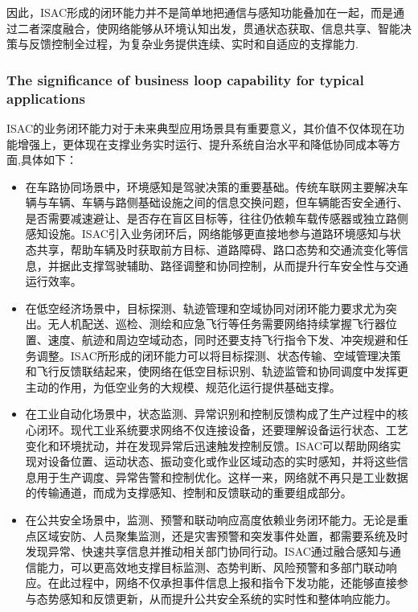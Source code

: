 因此，ISAC形成的闭环能力并不是简单地把通信与感知功能叠加在一起，而是通过二者深度融合，使网络能够从环境认知出发，贯通状态获取、信息共享、智能决策与反馈控制全过程，为复杂业务提供连续、实时和自适应的支撑能力.

\subsubsection{The significance of business loop capability for typical applications}
\label{subsubsec:ch1-isac-core value-closed loop-applications}

ISAC的业务闭环能力对于未来典型应用场景具有重要意义，其价值不仅体现在功能增强上，更体现在支撑业务实时运行、提升系统自治水平和降低协同成本等方面,具体如下：

\begin{itemize}
\item 在车路协同场景中，环境感知是驾驶决策的重要基础。传统车联网主要解决车辆与车辆、车辆与路侧基础设施之间的信息交换问题，但车辆能否安全通行、是否需要减速避让、是否存在盲区目标等，往往仍依赖车载传感器或独立路侧感知设施。ISAC引入业务闭环后，网络能够更直接地参与道路环境感知与状态共享，帮助车辆及时获取前方目标、道路障碍、路口态势和交通流变化等信息，并据此支撑驾驶辅助、路径调整和协同控制，从而提升行车安全性与交通运行效率。

\item 在低空经济场景中，目标探测、轨迹管理和空域协同对闭环能力要求尤为突出。无人机配送、巡检、测绘和应急飞行等任务需要网络持续掌握飞行器位置、速度、航迹和周边空域动态，同时还要支持飞行指令下发、冲突规避和任务调整。ISAC所形成的闭环能力可以将目标探测、状态传输、空域管理决策和飞行反馈联结起来，使网络在低空目标识别、轨迹监管和协同调度中发挥更主动的作用，为低空业务的大规模、规范化运行提供基础支撑。

\item 在工业自动化场景中，状态监测、异常识别和控制反馈构成了生产过程中的核心闭环。现代工业系统要求网络不仅连接设备，还要理解设备运行状态、工艺变化和环境扰动，并在发现异常后迅速触发控制反馈。ISAC可以帮助网络实现对设备位置、运动状态、振动变化或作业区域动态的实时感知，并将这些信息用于生产调度、异常告警和控制优化。这样一来，网络就不再只是工业数据的传输通道，而成为支撑感知、控制和反馈联动的重要组成部分。

\item 在公共安全场景中，监测、预警和联动响应高度依赖业务闭环能力。无论是重点区域安防、人员聚集监测，还是灾害预警和突发事件处置，都需要系统及时发现异常、快速共享信息并推动相关部门协同行动。ISAC通过融合感知与通信能力，可以更高效地支撑目标监测、态势判断、风险预警和多部门联动响应。在此过程中，网络不仅承担事件信息上报和指令下发功能，还能够直接参与态势感知和反馈更新，从而提升公共安全系统的实时性和整体响应能力。   
\end{itemize}


